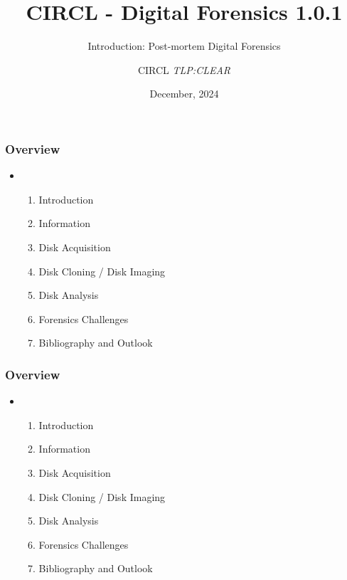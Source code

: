 \documentclass{beamer}
\author{CIRCL \emph{TLP:CLEAR}}
\title{CIRCL - Digital Forensics 1.0.1}
\subtitle{Introduction: Post-mortem Digital Forensics}
\institute{info@circl.lu}
\date{December, 2024}
\begin{document}
\begin{frame}[t,plain]
\titlepage
\end{frame}


\begin{frame}
  \frametitle{Overview}
  \begin{itemize}
  \item[]
      \begin{enumerate}
          \item Introduction
          \item Information
          \item Disk Acquisition
          \item Disk Cloning / Disk Imaging
          \item Disk Analysis
          \item Forensics Challenges
          \item Bibliography and Outlook
      \end{enumerate}
  \end{itemize}
\end{frame}










\begin{frame}
  \frametitle{Overview}
  \begin{itemize}
  \item[]
      \begin{enumerate}
          \item Introduction
          \item Information
          \item Disk Acquisition
          \item Disk Cloning / Disk Imaging
          \item Disk Analysis
          \item Forensics Challenges
          \item Bibliography and Outlook
      \end{enumerate}
  \end{itemize}
\end{frame}
\end{document}
